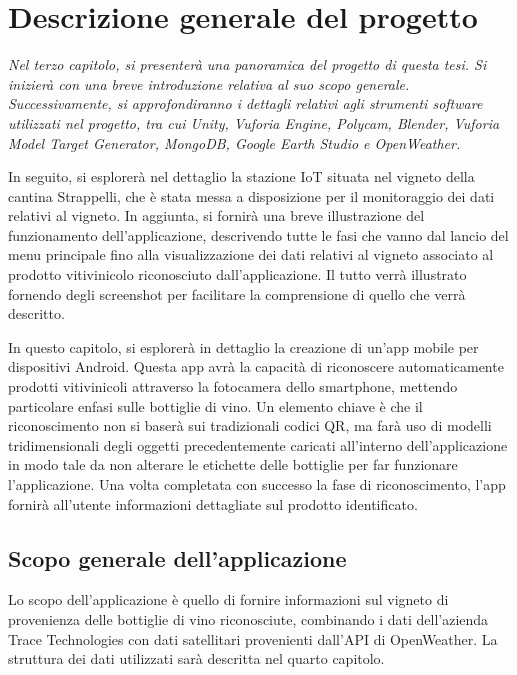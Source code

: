 \chapter{Descrizione generale del progetto}

\begin{preamble}
{\em 
Nel terzo capitolo, si presenterà una panoramica del progetto di questa tesi. Si inizierà con una breve introduzione relativa al suo scopo generale. Successivamente, si approfondiranno i dettagli relativi agli strumenti software utilizzati nel progetto, tra cui Unity, Vuforia Engine, Polycam, Blender, Vuforia Model Target Generator, MongoDB, Google Earth Studio e OpenWeather.

In seguito, si esplorerà nel dettaglio la stazione IoT situata nel vigneto della cantina Strappelli, che è stata messa a disposizione per il monitoraggio dei dati relativi al vigneto. In aggiunta, si fornirà una breve illustrazione del funzionamento dell'applicazione, descrivendo tutte le fasi che vanno dal lancio del menu principale fino alla visualizzazione dei dati relativi al vigneto associato al prodotto vitivinicolo riconosciuto dall'applicazione. Il tutto verrà illustrato fornendo degli screenshot per facilitare la comprensione di quello che verrà descritto.
}
\end{preamble}

In questo capitolo, si esplorerà in dettaglio la creazione di un'app mobile per dispositivi Android. Questa app avrà la capacità di riconoscere automaticamente prodotti vitivinicoli attraverso la fotocamera dello smartphone, mettendo particolare enfasi sulle bottiglie di vino. Un elemento chiave è che il riconoscimento non si baserà sui tradizionali codici QR, ma farà uso di modelli tridimensionali degli oggetti precedentemente caricati all'interno dell'applicazione in modo tale da non alterare le etichette delle bottiglie per far funzionare l'applicazione. Una volta completata con successo la fase di riconoscimento, l'app fornirà all'utente informazioni dettagliate sul prodotto identificato.

\section{Scopo generale dell'applicazione}

Lo scopo dell'applicazione è quello di fornire informazioni sul vigneto di provenienza delle bottiglie di vino riconosciute, combinando i dati dell'azienda Trace Technologies con dati satellitari provenienti dall'API di OpenWeather. La struttura dei dati utilizzati sarà descritta nel quarto capitolo.

